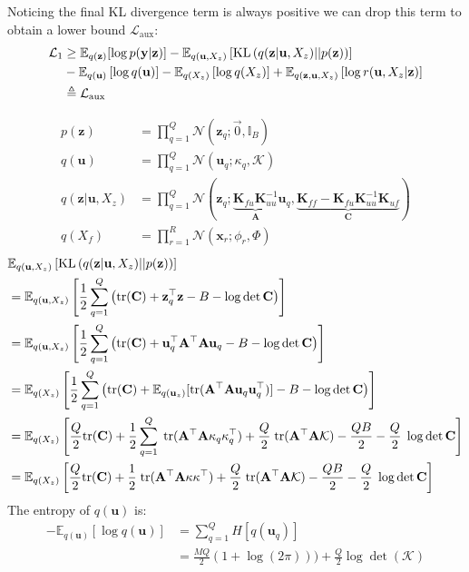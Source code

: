 \documentclass[12pt]{article}
\newcommand{\Kappa}{\mathcal{K}}
\newcommand{\xb}{\mathbf{x}}
\newcommand{\ub}{\mathbf{u}}
\newcommand{\zb}{\mathbf{z}}
\newcommand{\Cb}{\mathbf{C}}
\newcommand{\Ab}{\mathbf{A}}
\newcommand{\yb}{\mathbf{y}}
\newcommand{\Lo}{\mathcal{L}_1}
\newcommand{\Laux}{\mathcal{L}_{\mathrm{aux}}}
\newcommand{\Kff}{\mathbf{K}_{ff}}
\newcommand{\Kuu}{\mathbf{K}_{uu}}
\newcommand{\Kuf}{\mathbf{K}_{uf}}
\newcommand{\Kfu}{\mathbf{K}_{fu}}
\newcommand{\Ex}{\mathbb{E}}
\newcommand{\KL}{\mathrm{KL}}
\newcommand{\tr}{\mathrm{tr}}
\begin{document}
%
Noticing the final KL divergence term is always positive we can drop this term to obtain a lower bound $\Laux:$
%
\begin{align}
\Lo &\ge \Ex_{q(\zb)}[\log p(\yb|\zb)] - \Ex_{q(\ub,X_z)}\left[\KL\left(q(\zb|\ub,X_z)||p(\zb)\right)\right] \notag \\
&-\Ex_{q(\ub)}\left[\log q(\ub)\right] - \Ex_{q(X_z)}\left[\log q(X_z)\right] + \Ex_{q(\zb,\ub,X_z)}\left[\log r(\ub,X_z|\zb)\right] \\
&\triangleq \Laux
\end{align}
%

\begin{align}
p(\zb) &= \prod_{q=1}^Q \mathcal{N}(\zb_q; \vec{0}, \mathbb{I}_B) \\
q(\ub) &= \prod_{q=1}^Q \mathcal{N}(\ub_q; \kappa_q, \Kappa) \\
q(\zb|\ub,X_z) &= \prod_{q=1}^Q \mathcal{N}(\zb_q; \underbrace{\Kfu\Kuu^{-1}}_{\Ab}\ub_q, \underbrace{\Kff-\Kfu\Kuu^{-1}\Kuf}_{\Cb}) \\
q(X_f) &= \prod_{r=1}^R \mathcal{N}(\xb_r; \phi_r, \Phi)
\end{align}
%
\begin{align}
&\Ex_{q(\ub,X_z)}\left[\KL\left(q(\zb|\ub,X_z)||p(\zb)\right)\right] \notag \\
&= \Ex_{q(\ub,X_z)}\left[\frac{1}{2}\sum_{q=1}^Q \left(\tr(\Cb) + \zb_q^\top\zb - B -  \log\det\Cb \right)\right] \\
&= \Ex_{q(\ub,X_z)}\left[\frac{1}{2}\sum_{q=1}^Q \left(\tr(\Cb) + \ub_q^\top\Ab^\top\Ab\ub_q - B -  \log\det\Cb \right)\right] \\
&=\Ex_{q(X_z)}\left[\frac{1}{2}\sum_{q=1}^Q \left(\tr(\Cb) + \Ex_{q(\ub_z)}[\tr(\Ab^\top\Ab\ub_q\ub_q^\top)] - B -  \log\det\Cb \right)\right] \\
&=\Ex_{q(X_z)}\left[\frac{Q}{2}\tr(\Cb) + \frac{1}{2}\sum_{q=1}^Q\;\tr(\Ab^\top\Ab\kappa_q\kappa_q^\top) + \frac{Q}{2}\;\tr(\Ab^\top\Ab\Kappa) - \frac{QB}{2} -  \frac{Q}{2}\;\log\det\Cb \right] \\
&=\Ex_{q(X_z)}\left[\frac{Q}{2}\tr(\Cb) + \frac{1}{2}\;\tr(\Ab^\top\Ab\kappa\kappa^\top) + \frac{Q}{2}\;\tr(\Ab^\top\Ab\Kappa) - \frac{QB}{2} -  \frac{Q}{2}\;\log\det\Cb \right]
\end{align}
%
The entropy of $q(\ub)$ is:
%
\begin{align}
-\Ex_{q(\ub)}\left[\log q(\ub)\right] &= \sum_{q=1}^Q H[q(\ub_q)] \\
&= \frac{MQ}{2}(1+\log(2\pi))) + \frac{Q}{2}\log\det(\Kappa)
\end{align}
\end{document}

